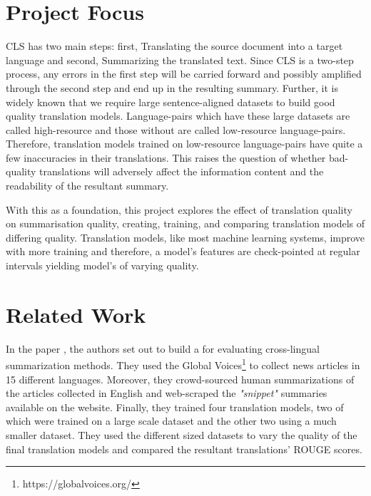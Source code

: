 \documentclass[12pt,a4paper,twoside,openright]{report}
\begin{document}
\section{Project Focus}
\label{project-focus}

CLS has two main steps: first, Translating the source document into a target language and second, Summarizing the translated text. Since CLS is a two-step process, any errors in the first step will be carried forward and possibly amplified through the second step and end up in the resulting summary. Further, it is widely known that we require large sentence-aligned datasets to build good quality translation models. Language-pairs which have these large datasets are called high-resource and those without are called low-resource language-pairs. Therefore, translation models trained on low-resource language-pairs have quite a few inaccuracies in their translations. This raises the question of whether bad-quality translations will adversely affect the information content and the readability of the resultant summary.

With this as a foundation, this project explores the effect of translation quality on summarisation quality, creating, training, and comparing translation models of differing quality. Translation models, like most machine learning systems, improve with more training and therefore, a model's features are check-pointed at regular intervals yielding model's of varying quality.

\section{Related Work}
\label{related-work}
In the paper \cite{nguyen-daume-iii-2019-global}, the authors set out to build a for evaluating cross-lingual summarization methods. They used the Global Voices\footnote{https://globalvoices.org/} to collect news articles in 15 different languages. Moreover, they crowd-sourced human summarizations of the articles collected in English and web-scraped the \textit{"snippet"} summaries available on the website. Finally, they trained four translation models, two of which were trained on a large scale dataset and the other two using a much smaller dataset. They used the different sized datasets to vary the quality of the final translation models and compared the resultant translations' ROUGE scores.
\end{document}
